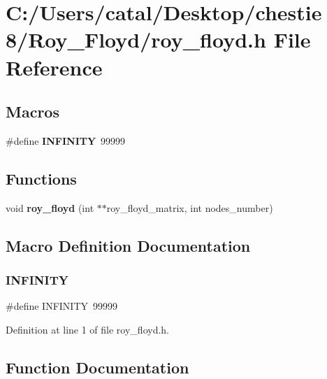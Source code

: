 \section{C\+:/\+Users/catal/\+Desktop/chestie 8/\+Roy\+\_\+\+Floyd/roy\+\_\+floyd.h File Reference}
\label{roy__floyd_8h}
\subsection*{Macros}
\begin{DoxyCompactItemize}
\item 
\#define \textbf{ I\+N\+F\+I\+N\+I\+TY}~99999
\end{DoxyCompactItemize}
\subsection*{Functions}
\begin{DoxyCompactItemize}
\item 
void \textbf{ roy\+\_\+floyd} (int $\ast$$\ast$roy\+\_\+floyd\+\_\+matrix, int nodes\+\_\+number)
\end{DoxyCompactItemize}


\subsection{Macro Definition Documentation}
\mbox{\label{roy__floyd_8h_a956e2723d559858d08644ac99146e910}} 
\subsubsection{I\+N\+F\+I\+N\+I\+TY}
{\footnotesize\ttfamily \#define I\+N\+F\+I\+N\+I\+TY~99999}



Definition at line 1 of file roy\+\_\+floyd.\+h.



\subsection{Function Documentation}
\mbox{\label{roy__floyd_8h_a0771d034a43d8d0ac1df7a3dc9b363e2}} 
